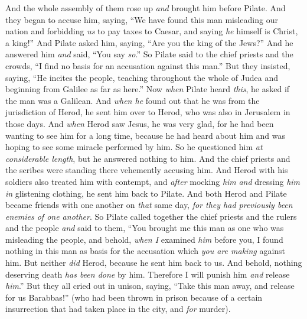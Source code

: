 \begin{biblechapter} %
 And the whole assembly of them rose up \textit{and} brought him before Pilate.
\verse And they began to accuse him, saying, “We have found this man misleading our nation and forbidding \textit{us} to pay taxes to Caesar, and saying \textit{he} himself is Christ, a king!”
\verse And Pilate asked him, saying, “Are you the king of the Jews?” And he answered him \textit{and} said, “You say \textit{so}.”
\verse So Pilate said to the chief priests and the crowds, “I find no basis for an accusation against this man.”
\verse But they insisted, saying, “He incites the people, teaching throughout the whole of Judea and beginning from Galilee as far as here.”
 Now \textit{when} Pilate heard \textit{this}, he asked if the man was a Galilean.
\verse And \textit{when he} found out that he was from the jurisdiction of Herod, he sent him over to Herod, who was also in Jerusalem in those days.
\verse And \textit{when} Herod saw Jesus, he was very glad, for he had been wanting to see him for a long time, because he had heard about him and was hoping to see some miracle performed by him.
\verse So he questioned him \textit{at considerable length}, but he answered nothing to him.
\verse And the chief priests and the scribes were standing there vehemently accusing him.
\verse And Herod with his soldiers also treated him with contempt, and \textit{after} mocking \textit{him} \textit{and} dressing \textit{him} \textit{in} glistening clothing, he sent him back to Pilate.
\verse And both Herod and Pilate became friends with one another on \textit{that} same day, \textit{for they had previously been enemies of one another}.
 So Pilate called together the chief priests and the rulers and the people
\verse \textit{and} said to them, “You brought me this man as one who was misleading the people, and behold, \textit{when I} examined \textit{him} before you, I found nothing in this man as basis for the accusation which \textit{you are making} against him.
\verse But neither \textit{did} Herod, because he sent him back to us. And behold, nothing deserving death \textit{has been done} by him.
\verse Therefore I will punish him \textit{and} release \textit{him}.” 
\verse But they all cried out in unison, saying, “Take this man away, and release for us Barabbas!”
\verse (who had been thrown in prison because of a certain insurrection that had taken place in the city, and \textit{for} murder).

\end{biblechapter}
